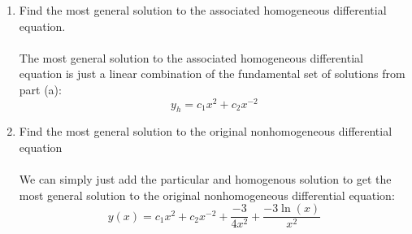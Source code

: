 \documentclass[12pt]{article}
\begin{document}
\begin{enumerate}[label = (\alph*)]
 		\item Find the most general solution to the associated homogeneous differential equation.
 		\\ \\
 		The most general solution to the associated homogeneous differential equation is just a linear combination of the fundamental set of solutions from part (a):
	 		\boldmath
	 		$$
	 		y_h = c_1x^2 + c_2x^{-2}
	 		$$
	 		\unboldmath
 		\item Find the most general solution to the original nonhomogeneous differential equation
 		\\ \\
 		We can simply just add the particular and homogenous solution to get the most general solution to the original nonhomogeneous differential equation:
	 		\boldmath	
	 		$$
	 		y(x) = c_1x^2 + c_2x^{-2} + \frac{-3}{4x^2} + \frac{-3\ln(x)}{x^2}
	 		$$
	 		\unboldmath
	\end{enumerate}

\newpage 
\end{document}
